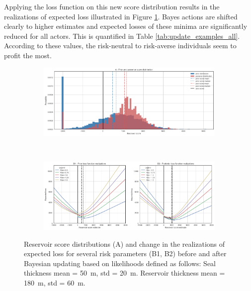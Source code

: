 				Applying the loss function on this new score distribution results in the realizations of expected loss illustrated in Figure \ref{fig:update_goodseal2_3}. Bayes actions are shifted clearly to higher estimates and expected losses of these minima are significantly reduced for all actors. This is quantified in Table \ref{tab:update_examples_all}. According to these values, the risk-neutral to risk-averse individuals seem to profit the most.
				
				\begin{figure}[h]
					\begin{subfigure}{1\textwidth}
						\centering
						\includegraphics[width=1\linewidth]{Figures/update_goodseal2.png}
					\end{subfigure}%
					\\
					\begin{subfigure}{1\textwidth}
						\centering
						\includegraphics[width=1\linewidth]{Figures/update_goodseal3.png}
					\end{subfigure}
					\caption{Reservoir score distributions (A) and change in the realizations of expected loss for several risk parameters (B1, B2) before and after Bayesian updating based on likelihoods defined as follows: Seal thickness mean = 50~m, std = 20~m. Reservoir thickness mean = 180~m, std = 60~m.}
					\label{fig:update_goodseal2_3}
				\end{figure}
				
